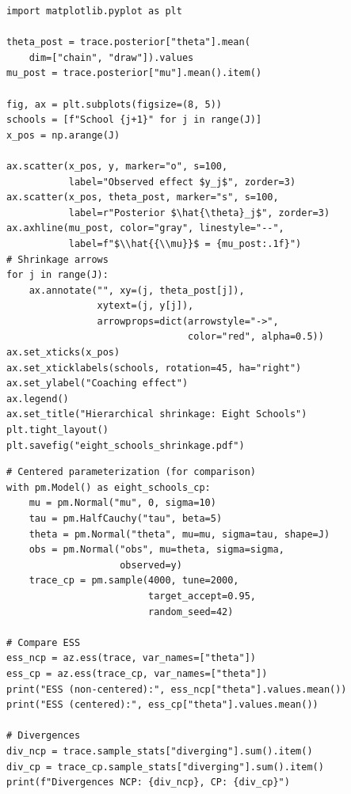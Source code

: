 \begin{codeblock}[title=\textbf{Visualizing hierarchical shrinkage}]
\begin{verbatim}
import matplotlib.pyplot as plt

theta_post = trace.posterior["theta"].mean(
    dim=["chain", "draw"]).values
mu_post = trace.posterior["mu"].mean().item()

fig, ax = plt.subplots(figsize=(8, 5))
schools = [f"School {j+1}" for j in range(J)]
x_pos = np.arange(J)

ax.scatter(x_pos, y, marker="o", s=100,
           label="Observed effect $y_j$", zorder=3)
ax.scatter(x_pos, theta_post, marker="s", s=100,
           label=r"Posterior $\hat{\theta}_j$", zorder=3)
ax.axhline(mu_post, color="gray", linestyle="--",
           label=f"$\\hat{{\\mu}}$ = {mu_post:.1f}")
# Shrinkage arrows
for j in range(J):
    ax.annotate("", xy=(j, theta_post[j]),
                xytext=(j, y[j]),
                arrowprops=dict(arrowstyle="->",
                                color="red", alpha=0.5))
ax.set_xticks(x_pos)
ax.set_xticklabels(schools, rotation=45, ha="right")
ax.set_ylabel("Coaching effect")
ax.legend()
ax.set_title("Hierarchical shrinkage: Eight Schools")
plt.tight_layout()
plt.savefig("eight_schools_shrinkage.pdf")
\end{verbatim}
\end{codeblock}

\begin{codeblock}[title=\textbf{Centered vs.\ non-centered comparison}]
\begin{verbatim}
# Centered parameterization (for comparison)
with pm.Model() as eight_schools_cp:
    mu = pm.Normal("mu", 0, sigma=10)
    tau = pm.HalfCauchy("tau", beta=5)
    theta = pm.Normal("theta", mu=mu, sigma=tau, shape=J)
    obs = pm.Normal("obs", mu=theta, sigma=sigma,
                    observed=y)
    trace_cp = pm.sample(4000, tune=2000,
                         target_accept=0.95,
                         random_seed=42)

# Compare ESS
ess_ncp = az.ess(trace, var_names=["theta"])
ess_cp = az.ess(trace_cp, var_names=["theta"])
print("ESS (non-centered):", ess_ncp["theta"].values.mean())
print("ESS (centered):", ess_cp["theta"].values.mean())

# Divergences
div_ncp = trace.sample_stats["diverging"].sum().item()
div_cp = trace_cp.sample_stats["diverging"].sum().item()
print(f"Divergences NCP: {div_ncp}, CP: {div_cp}")
\end{verbatim}
\end{codeblock}

